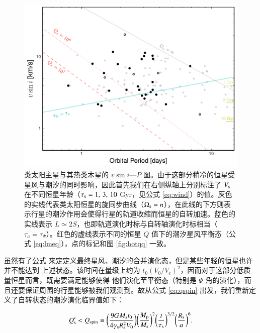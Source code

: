 \begin{figure}[t]
\centering
\includegraphics[width=1.0\textwidth]{figures/chapter4/fig10a_cold.pdf}
\caption{类太阳主星与其热类木星的 $v\sin i $---$P$ 图。由于这部分稍冷的恒星受星风与潮汐的同时影响，因此首先我们在右侧纵轴上分别标注了 $V_\mathrm{s}$ 在不同恒星年龄（$\tau_\mathrm{s} = 1,\,3,\,10$ Gyr，见公式 \ref{eq:wind}）的值。灰色的实线代表类太阳恒星的旋同步曲线（$\Omega_\mathrm{s} = n$），在此线的下方则表示行星的潮汐作用会使得行星的轨道收缩而恒星的自转加速。蓝色的实线表示 $L \simeq 2S$，也即轨道演化时标与自转轴演化时标相当（$\tau_a = \tau_\Psi$）。红色的虚线表示不同的恒星 $Q$ 值下的潮汐星风平衡态（公式 \ref{eq:lmeq}），点的标记和图 \ref{fig:hotqq} 一致。}
\label{fig:coldevo}
\end{figure}

虽然有了公式 \label{eq:lmeq} 来定定义最终星风、潮汐的合并演化态，但是某些年轻的恒星也许并不能达到
上述状态。该时间在量级上约为 $t_0(V_0/V_e)^2$，因而对于这部分低质量恒星而言，既需要满足能够使得
他们演化至平衡态（特别是 $\Psi$ 角的演化），而且还要保证周围的行星能够被我们观测到。故从公式 
\ref{eq:qspin} 出发，我们重新定义了自转状态的潮汐演化临界值如下：

\begin{equation} \label{eq:lmqspin}
Q_\mathrm{s}^{\prime} < Q_\mathrm{spin} \equiv \bigg( 
\frac{9G M_\mathrm{s}t_0}{4 \gamma_\mathrm{s}R_\mathrm{s}^2V_0} \bigg) 
\bigg( \frac{M_\mathrm{p}}{M_\mathrm{s}} \bigg)^2  
\bigg( \frac{t}{\tau_\mathrm{s}} \bigg)^{3/2} \bigg( \frac{R_\mathrm{s}}{a} \bigg)^6.
\end{equation} %

